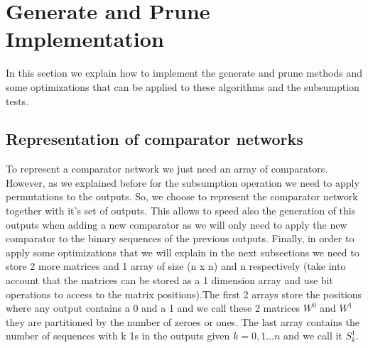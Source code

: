 \documentclass[../main.tex]{subfiles}
\begin{document}
	\section{Generate and Prune Implementation}
	In this section we explain how to implement the generate and prune methods and some optimizations that can be applied to these algorithms and the subsumption tests.
	
	\subsection{Representation of comparator networks}
	To represent a comparator network we just need an array of comparators. However, as we explained before for the subsumption operation we need to apply permutations to the outputs. So, we choose to represent the comparator network together with it's set of outputs. This allows to speed also the generation of this outputs when adding a new comparator as we will only need to apply the new comparator to the binary sequences of the previous outputs. Finally, in order to apply some optimizations that we will explain in the next subsections we need to store 2 more matrices and 1 array of size (n x n) and n respectively (take into account that the matrices can be stored as a 1 dimension array and use bit operations to access to the matrix positions).The first 2 arrays store the positions where any output contains a 0 and a 1 and we call  these 2 matrices $W^0$ and $W^1$ they are partitioned by the number of zeroes or ones. The last array contains the number of sequences with k 1s in the outputs given $k=0,1...n$ and we call it $S^{1}_k$.
	
\end{document}
